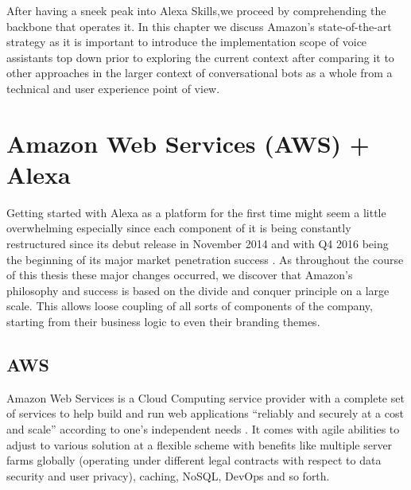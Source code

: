 
After having a sneek peak into Alexa Skills,we proceed by comprehending the backbone that operates it.
In this chapter we discuss Amazon's state-of-the-art strategy
as it is important to introduce the implementation scope of voice assistants 
top down
prior to exploring the current context 
after comparing it to other approaches in the larger context of conversational bots as a whole from a technical and user experience point of view. 


\section[Amazon Web Services + Alexa]{Amazon Web Services (AWS) + Alexa}


Getting started with Alexa as a platform for the first time might seem a little overwhelming especially since each component of it is being  constantly restructured since its debut release in November 2014 and with Q4 2016 being the beginning of its major market penetration success \cite{gartnerpreds17}. %
As throughout the course of this thesis these major changes occurred, we discover that Amazon's philosophy and success is based on the divide and conquer principle on  a large scale. This allows loose coupling of all sorts of components of the company, starting from their business logic to even their branding themes. %
 

\subsection*{AWS}
Amazon Web Services is a Cloud Computing service provider with a complete set of services to help build and run web applications ``reliably and securely at a cost and scale'' according to one's independent needs \cite{aws_website}.
It comes with agile abilities to adjust to various solution at a flexible scheme with benefits like multiple server farms globally (operating under different legal contracts with respect to data security and user privacy), caching, NoSQL, DevOps and so forth.


